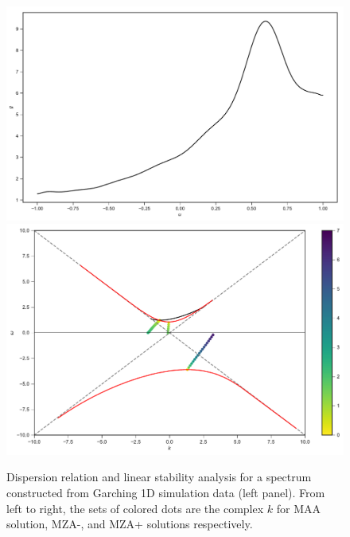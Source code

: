 \documentclass[%
preprint,
 amsmath,amssymb,
 aps,
 prd
]{revtex4-1}
\begin{document}
\begin{figure}
     \includegraphics[width=\linewidth]{assets/spectGarchingPlt.pdf}
   \endminipage\hfill
   \includegraphics[width=\linewidth]{assets/spectGarchingDRLSAPlt.pdf}
   \endminipage\hfill
   \caption{Dispersion relation and linear stability analysis for a spectrum constructed from Garching 1D simulation data (left panel). From left to right, the sets of colored dots are the complex $k$ for MAA solution, MZA-, and MZA+ solutions respectively.
    }
   \label{fig-garching}
\end{figure}




\end{document}

